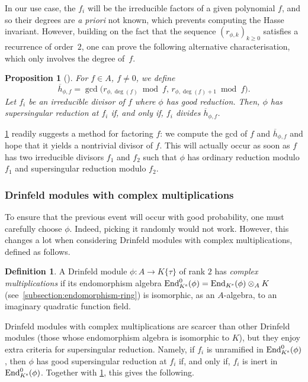 \documentclass[11pt]{article}
\newtheorem{proposition}[theorem]{Proposition}
\theoremstyle{definition}
\newtheorem{definition}[theorem]{Definition}
\renewcommand\geq{\geqslant}
\newcommand\End{\text{\rm End}}
\newcommand{\Ks}{K^{\text{\rm s}}}
\begin{document}
In our use case, the $f_i$ will be the irreducible factors of a given 
polynomial $f$, and so their degrees are \emph{a priori} not known, which
prevents computing the Hasse invariant. However, building on the fact that the sequence $(r_{\phi, k})_{k \geq 0}$ satisfies a recurrence of order~$2$, one can prove the following alternative characterisation, which only involves
the degree of~$f$.

\begin{proposition}[]
\label{prop:lemme-6}
  For $f \in A$, $f \neq 0$, we define
\[
  \overline{h}_{\phi, f}
  = \gcd\big(r_{\phi, \deg(f)} \bmod{f},\,
              r_{\phi, \deg(f)+1} \bmod{f}\big).
\]
  Let $f_i$ be an irreducible divisor of $f$ where $\phi$ has good reduction.
  Then,
  $\phi$ has supersingular reduction at $f_i$ if, and only if, $f_i$ divides
  $\overline{h}_{\phi, f}$.
\end{proposition}

\cref{prop:lemme-6} readily suggests a method for factoring $f$: we compute 
the gcd of $f$ and $\overline{h}_{\phi, f}$ and hope that it yields a
nontrivial divisor of $f$. This will actually occur as soon as $f$ has two
irreducible divisors $f_1$ and $f_2$ such that $\phi$ has ordinary reduction
modulo $f_1$ and supersingular reduction modulo $f_2$.

\subsubsection{Drinfeld modules with complex multiplications}
\label{ssec:facto:complexmultiplication}

To ensure that the previous event will occur with good probability, one must carefully choose $\phi$.
Indeed, picking it randomly would not work. However, this changes a lot when considering Drinfeld modules with complex multiplications, defined as
follows.

\begin{definition}
A Drinfeld module $\phi : A \to K\{\tau\}$ of rank $2$ 
has \emph{complex multiplications}
if its endomorphism algebra $\End^0_{\Ks}(\phi) = \End_{\Ks}(\phi) \otimes_A K$ 
(see~\cref{subsection:endomorphism-ring}) is isomorphic, as an $A$-algebra, to an imaginary quadratic function field.
\end{definition}

Drinfeld modules with complex multiplications
are scarcer than other Drinfeld modules (those whose endomorphism algebra is
isomorphic to $K$), but they enjoy extra criteria for supersingular reduction.
Namely, if $f_i$ is unramified in $\End^0_{\Ks}(\phi)$, then $\phi$ has good
supersingular reduction at $f_i$ if, and only if, $f_i$ is inert in
$\End^0_{\Ks}(\phi)$. Together with \cref{prop:lemme-6}, this gives the following.
\end{document}
